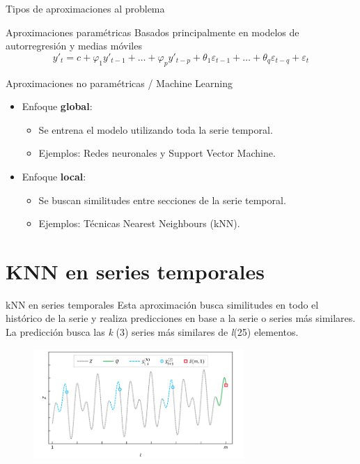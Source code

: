 \documentclass[12pt, aspectratio=169]{beamer} %
\begin{document}
\begin{frame}{Tipos de aproximaciones al problema}
  \begin{block}{Aproximaciones paramétricas}
    Basados principalmente en modelos de autorregresión y medias móviles
    \[ y'_t = c + \varphi_1y'_{t-1} + \ldots + \varphi_py'_{t-p} +
          \theta_1\varepsilon_{t-1} + \ldots + \theta_q\varepsilon_{t-q} + \varepsilon_t\]
  \end{block}

  \begin{block}{Aproximaciones no paramétricas / Machine Learning}
    \begin{itemize}
    \item Enfoque \textbf{global}:
      \begin{itemize}
      \item Se entrena el modelo utilizando toda la serie temporal.
      \item Ejemplos: Redes neuronales y Support Vector Machine.
      \end{itemize}
    \item Enfoque \textbf{local}:
      \begin{itemize}
      \item Se buscan similitudes entre secciones de la serie temporal.
      \item Ejemplos: Técnicas Nearest Neighbours (kNN).
      \end{itemize}
    \end{itemize}

  \end{block}

\end{frame}

\section{KNN en series temporales}

\begin{frame}{kNN en series temporales}
  Esta aproximación busca similitudes en todo el histórico de la serie y realiza predicciones en base a la serie o series más similares.
  La predicción busca las \textit{k} (3) series más similares de \textit{l}(25) elementos. 
  \begin{figure}
  \includegraphics[width=8cm]{20210312_1_knn_summary.png}
  \label{fig:ejemplo_knn_ts}
\end{figure}

\end{frame}
\end{document}
